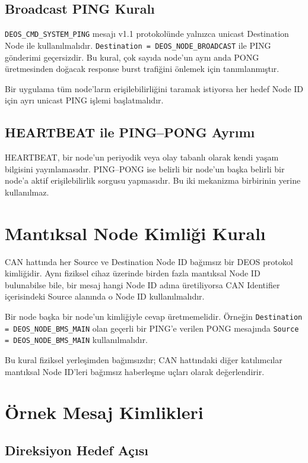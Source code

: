 \documentclass[a4paper,10pt]{article}
\newcommand{\code}[1]{\texttt{#1}}
\begin{document}
\subsection{Broadcast PING Kuralı}

\code{DEOS\_CMD\_SYSTEM\_PING} mesajı v1.1 protokolünde yalnızca unicast Destination Node
ile kullanılmalıdır. \code{Destination = DEOS\_NODE\_BROADCAST} ile PING gönderimi geçersizdir.
Bu kural, çok sayıda node'un aynı anda PONG üretmesinden doğacak response burst trafiğini
önlemek için tanımlanmıştır.

Bir uygulama tüm node'ların erişilebilirliğini taramak istiyorsa her hedef Node ID için ayrı
unicast PING işlemi başlatmalıdır.

\subsection{HEARTBEAT ile PING--PONG Ayrımı}

HEARTBEAT, bir node'un periyodik veya olay tabanlı olarak kendi yaşam bilgisini yayınlamasıdır.
PING--PONG ise belirli bir node'un başka belirli bir node'a aktif erişilebilirlik sorgusu
yapmasıdır. Bu iki mekanizma birbirinin yerine kullanılmaz.

\section{Mantıksal Node Kimliği Kuralı}

CAN hattında her Source ve Destination Node ID bağımsız bir DEOS protokol kimliğidir.
Aynı fiziksel cihaz üzerinde birden fazla mantıksal Node ID bulunabilse bile, bir mesaj
hangi Node ID adına üretiliyorsa CAN Identifier içerisindeki Source alanında o Node ID
kullanılmalıdır.

Bir node başka bir node'un kimliğiyle cevap üretmemelidir. Örneğin
\code{Destination = DEOS\_NODE\_BMS\_MAIN} olan geçerli bir PING'e verilen PONG mesajında
\code{Source = DEOS\_NODE\_BMS\_MAIN} kullanılmalıdır.

Bu kural fiziksel yerleşimden bağımsızdır; CAN hattındaki diğer katılımcılar mantıksal
Node ID'leri bağımsız haberleşme uçları olarak değerlendirir.

\section{Örnek Mesaj Kimlikleri}

\subsection{Direksiyon Hedef Açısı}
\end{document}

